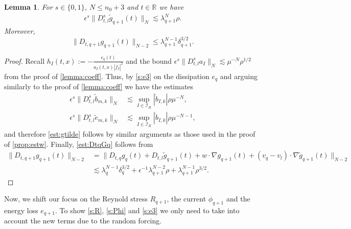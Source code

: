\documentclass[10pt,a4paper]{amsart}
\numberwithin{equation}{section}
\numberwithin{corollario}{section}
\newtheorem{lemma}{Lemma}
\numberwithin{lemma}{section}
\numberwithin{prop}{section}
\theoremstyle{definition}
\theoremstyle{remark}
\newcommand{\R}{\mathbb{R}}
\newcommand{\qq}{_{q+1}}
\begin{document}
\begin{lemma} \label{lem:g}
    For $s \in \{0,1\}$, $N \leq n_0+3$ and $t \in \R$ we have
    \begin{align} \label{est:gtilde}
        \epsilon^s \| D^s_{t,l} \tilde{g}\qq(t) \|_N
        \lesssim
        \lambda\qq^N \rho.
    \end{align}
Moreover, 
\begin{equation}\label{est:DtqGq}
    \|D_{t,q+1}g\qq(t)\|_{N-2}\le \lambda\qq^{N-1}\delta\qq^{3/2}.
\end{equation}
\end{lemma}
\begin{proof}
Recall $    h_I(t,x) := - \frac{e_q(t)}{a_I(t,x) |\overline{f_I}|^2}$ and the bound $\epsilon^s\|D^s_{t,l} a_I\|_N \lesssim \mu^{-N} \rho^{1/2}$ from the proof of \autoref{lemma:coeff}.
Thus, by \eqref{s:e3} on the dissipation $e_q$ and arguing similarly to the proof of \autoref{lemma:coeff} we have the estimates
\begin{align} \label{est:tilde.b}
    \epsilon^s \| D^s_{t,l} \tilde{b}_{m,k} \|_N
        &\lesssim
        \sup_{I \in \mathcal{I}_R} |\mathring{b}_{I,k}| \rho \mu^{-N},
        \\ \label{est:tilde.e}
        \epsilon^s \| D^s_{t,l} \tilde{e}_{m,k} \|_N
        &\lesssim
        \sup_{I \in \mathcal{I}_R} |\mathring{b}_{I,k}| \rho \mu^{-N-1},
\end{align}
and therefore \eqref{est:gtilde} follows by similar arguments as those used in the proof of \autoref{prop:estw}. Finally, \eqref{est:DtqGq} follows from
\begin{equation}
    \begin{aligned}
        \|D_{t,q+1}g\qq(t)\|_{N-2}&= \|D_{t,q}g_q(t)+D_{t,l}\tilde{g}\qq(t)+w\cdot\nabla g\qq(t)+(v_q-v_l)\cdot\nabla \tilde{g}\qq(t)\|_{N-2}\\
        &\lesssim\lambda_q^{N-1}\delta_q^{3/2}+\epsilon^{-1}\lambda\qq^{N-2}\rho+\lambda\qq^{N-1}\rho^{3/2}.
    \end{aligned}
\end{equation}
\end{proof}

Now, we shift our focus on the Reynold stress $R\qq$, the current $\phi\qq$ and the energy loss $e\qq$.
To show \eqref{s:R}, \eqref{s:Phi} and \eqref{s:e3} we only need to take into account the new terms due to the random forcing.
\end{document}
